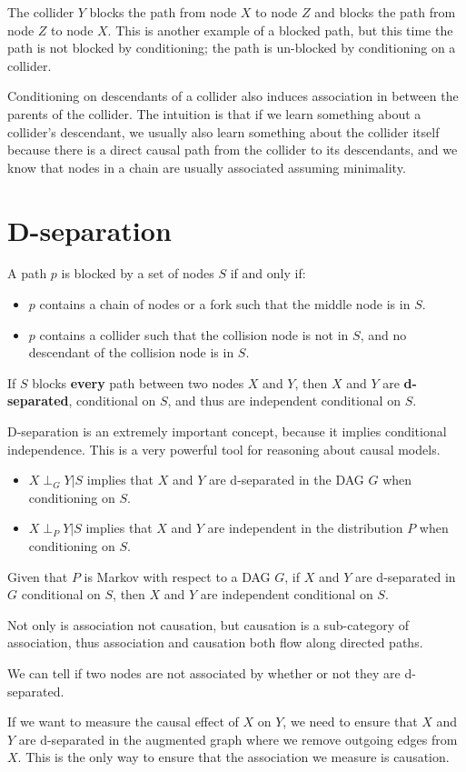 The collider $Y$ blocks the path from node $X$ to node $Z$ and blocks the path
from node $Z$ to node $X$. This is another example of a blocked path, but this
time the path is not blocked by conditioning; the path is un-blocked by conditioning
on a collider.

Conditioning on descendants of a collider also induces association in between the
parents of the collider. The intuition is that if we learn something about a
collider's descendant, we usually also learn something about the collider itself
because there is a direct causal path from the collider to its descendants, and
we know that nodes in a chain are usually associated assuming minimality.
\section{D-separation}
\begin{definition}
    A path $p$ is blocked by a set of nodes $S$ if and only if:
    \begin{itemize}
        \item $p$ contains a chain of nodes or a fork such that the middle node
              is in $S$.
        \item $p$ contains a collider such that the collision node is not in $S$,
              and no descendant of the collision node is in $S$.
    \end{itemize}
    If $S$ blocks \textbf{every} path between two nodes $X$ and $Y$, then $X$ and
    $Y$ are \textbf{d-separated}, conditional on $S$, and thus are independent
    conditional on $S$.
\end{definition}
D-separation is an extremely important concept, because it implies conditional
independence. This is a very powerful tool for reasoning about causal models.
\begin{itemize}
    \item $X \perp_G Y | S$ implies that $X$ and $Y$ are d-separated in the DAG
          $G$ when conditioning on $S$.
    \item $X \perp_P Y | S$ implies that $X$ and $Y$ are independent in the
          distribution $P$ when conditioning on $S$.
\end{itemize}
\begin{definition}
    Given that $P$ is Markov with respect to a DAG $G$, if $X$ and $Y$ are d-separated
    in $G$ conditional on $S$, then $X$ and $Y$ are independent conditional on $S$.
\end{definition}

Not only is association not causation, but causation is a sub-category of
association, thus association and causation both flow along directed paths.

We can tell if two nodes are not associated by whether or not they are d-separated.

If we want to measure the causal effect of $X$ on $Y$, we need to ensure that $X$
and $Y$ are d-separated in the augmented graph where we remove outgoing edges
from $X$. This is the only way to ensure that the association we measure is causation.